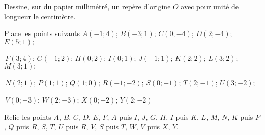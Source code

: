 \begin{myenumerate}
\item Dessine, sur du papier millimétré, un repère d'origine $O$ avec
pour unité de longueur le centimètre.
\item Place les points suivants
$A(-1;4)$; $B(-3;1)$; $C(0;-4)$; $D(2;-4)$; $E(5;1);$
\par$\,F(3;4)$; $G(-1;2)$; $H(0;2)$; $I(0;1)$; $J(-1;1)$; $K(2;2);
\,L(3;2)$; $M(3;1);$\par$\,N(2;1)$; $P(1;1)$; $Q(1;0)$; $R(-1;-2);
\,S(0;-1)$; $T(2;-1)$; $U(3;-2);$
\par$\,V(0;-3)$; $W(2;-3)$; $X(0;-2)$; $Y(2;-2)$
\item Relie les points $A$, $B$, $C$, $D$, $E$, $F$, $A$ puis $I$,
$J$, $G$, $H$, $I$ puis $K$, $L$, $M$, $N$, $K$ puis $P$, $Q$ puis
$R$, $S$, $T$, $U$ puis $R$, $V$, $S$ puis $T$, $W$, $V$ puis $X$,
$Y$.
\end{myenumerate}
